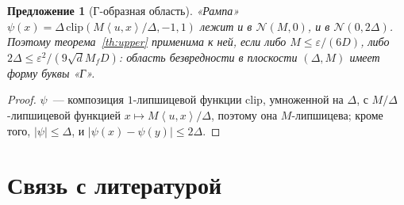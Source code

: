 \documentclass[12pt,a4paper]{article}
\theoremstyle{plain}
\newtheorem{proposition}{Предложение}
\theoremstyle{definition}
\theoremstyle{remark}
\newcommand{\eps}{\varepsilon}
\newcommand{\abs}[1]{\left\lvert #1\right\rvert}
\newcommand{\ip}[2]{\left\langle #1,#2\right\rangle}
\begin{document}
\begin{proposition}[Г-образная область]\label{prop:ramp}
«Рампа» $\psi(x)=\Delta\,\mathrm{clip}(M\ip ux/\Delta,-1,1)$ лежит и в $\mathcal N(M,0)$, и в $\mathcal N(0,2\Delta)$. Поэтому теорема~\ref{th:upper} применима к ней, если \emph{либо} $M\le\eps/(6D)$, \emph{либо} $2\Delta\le\eps^2/(9\sqrt dM_fD)$: область безвредности в плоскости $(\Delta,M)$ имеет форму буквы «Г».
\end{proposition}
\begin{proof}
$\psi$~--- композиция $1$-липшицевой функции $\mathrm{clip}$, умноженной на $\Delta$, с $M/\Delta$-липшицевой функцией $x\mapsto M\ip ux/\Delta$, поэтому она $M$-липшицева; кроме того, $\abs\psi\le\Delta$, и $\abs{\psi(x)-\psi(y)}\le2\Delta$.
\end{proof}

\section{Связь с литературой}\label{sec:lit}
\end{document}

